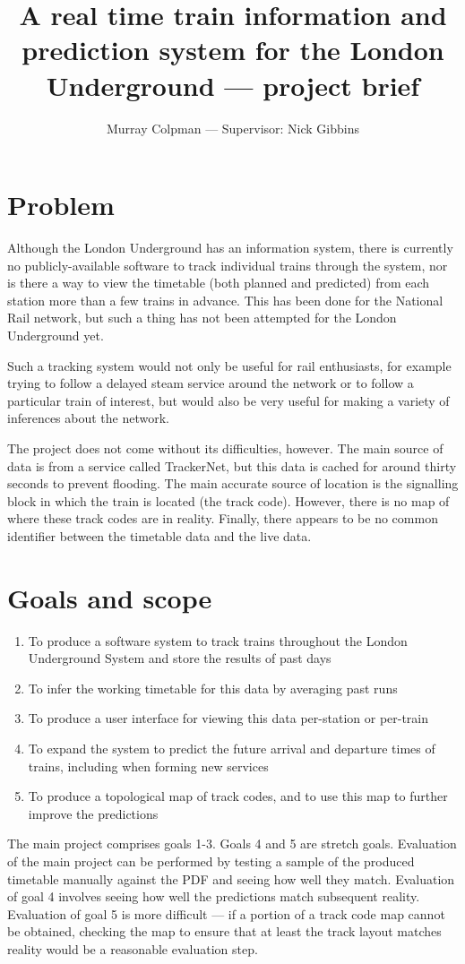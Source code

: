 \documentclass[a4paper,12pt]{article}
\title{A real time train information and prediction system for the London Underground --- project brief}
\author{Murray Colpman --- Supervisor: Nick Gibbins}
\begin{document}
\maketitle

\section*{Problem}

Although the London Underground has an information system, there is currently
no publicly-available software to track individual trains through the system,
nor is there a way to view the timetable (both planned and predicted) from each
station more than a few trains in advance. This has been done for the National
Rail network, but such a thing has not been attempted for the London
Underground yet.

Such a tracking system would not only be useful for rail enthusiasts, for
example trying to follow a delayed steam service around the network or to
follow a particular train of interest, but would also be very useful for making
a variety of inferences about the network.

The project does not come without its difficulties, however. The main source of
data is from a service called TrackerNet, but this data is cached for around
thirty seconds to prevent flooding. The main accurate source of location is the
signalling block in which the train is located (the track code).  However,
there is no map of where these track codes are in reality. Finally, there
appears to be no common identifier between the timetable data and the live
data.

\section*{Goals and scope}

\begin{enumerate}
  \item To produce a software system to track trains throughout the London
    Underground System and store the results of past days
  \item To infer the working timetable for this data by averaging past runs
  \item To produce a user interface for viewing this data per-station or
    per-train
  \item To expand the system to predict the future arrival and departure times
    of trains, including when forming new services
  \item To produce a topological map of track codes, and to use this map to
    further improve the predictions
\end{enumerate}

The main project comprises goals 1-3. Goals 4 and 5 are stretch goals.
Evaluation of the main project can be performed by testing a sample of the
produced timetable manually against the PDF and seeing how well they match.
Evaluation of goal 4 involves seeing how well the predictions match subsequent
reality. Evaluation of goal 5 is more difficult --- if a portion of a track
code map cannot be obtained, checking the map to ensure that at least the track
layout matches reality would be a reasonable evaluation step.
\end{document}
